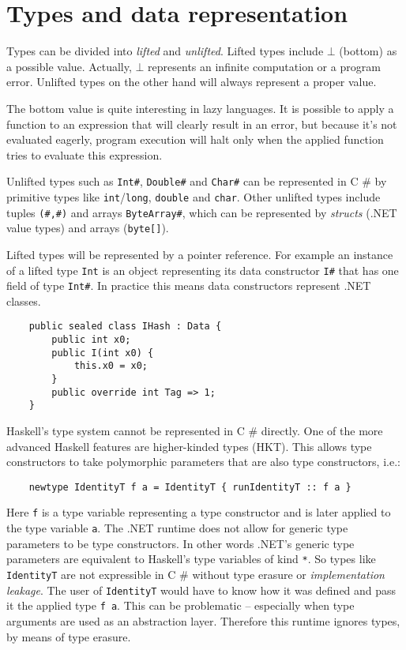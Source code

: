 \documentclass[en]{pracamgr}
\newcommand{\shrp}{%
  {\fontfamily{ppl}\selectfont\#%
  }}
\begin{document}
\section{Types and data representation}\label{s:data_rep}

Types can be divided into \textit{lifted} and \textit{unlifted}.
Lifted types include $\bot$ (bottom) as a possible value.
Actually, $\bot$ represents an infinite computation or
a program error. Unlifted types on the other hand will
always represent a proper value.

The bottom value is quite interesting in lazy languages.
It is possible to apply a function to an expression that
will clearly result in an error, but because it's not evaluated
eagerly, program execution will halt only when the applied function
tries to evaluate this expression.

Unlifted types such as \texttt{Int\#}, \texttt{Double\#}
and \texttt{Char\#} can be represented in C\shrp{} by
primitive types like \texttt{int}/\texttt{long}, \texttt{double} and \texttt{char}.
Other unlifted types include tuples \texttt{(\#,\#)} and
arrays \texttt{ByteArray\#}, which can be represented by
\textit{structs} (.NET value types) and arrays (\texttt{byte[]}).

Lifted types will be represented by a pointer reference.
For example an instance of a lifted type \texttt{Int} is an object representing
its data constructor \texttt{I\#} that has one field of type \texttt{Int\#}.
In practice this means data constructors represent .NET classes.

\begin{verbatim}
    public sealed class IHash : Data {
        public int x0;
        public I(int x0) {
            this.x0 = x0;
        }
        public override int Tag => 1;
    }
\end{verbatim}

Haskell's type system cannot be represented in C\shrp{} directly.
One of the more advanced Haskell features are higher-kinded types (HKT).
This allows type constructors to take polymorphic parameters
that are also type constructors, i.e.:

\begin{verbatim}
    newtype IdentityT f a = IdentityT { runIdentityT :: f a }
\end{verbatim}

Here \texttt{f} is a type variable representing a type constructor
and is later applied to the type variable \texttt{a}.
The .NET runtime does not allow for generic type parameters to be
type constructors. In other words .NET's generic type parameters are
equivalent to Haskell's type variables of kind \texttt{*}.
So types like \texttt{IdentityT} are not
expressible in C\shrp{} without type erasure or \textit{implementation leakage}.
The user of \texttt{IdentityT} would have to know how it
was defined and pass it the applied type \texttt{f a}. This can be
problematic -- especially when type arguments are used as an abstraction layer.
Therefore this runtime ignores types, by
means of type erasure.
\end{document}
